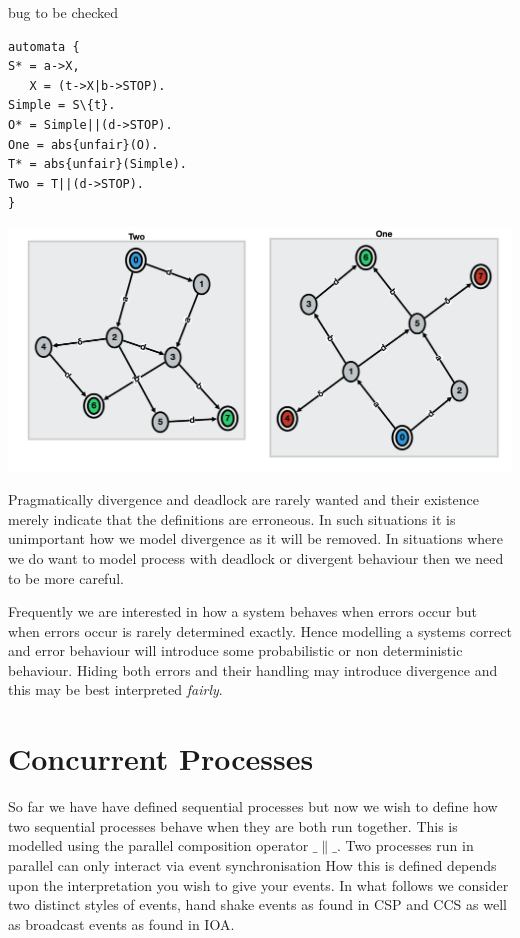 \documentclass[]{article}
\newcounter{dead1}
\newcounter{dead2}
\begin{document}
{\color{red} bug to be checked}
\noindent\begin{center}
\begin{minipage}{0.3\textwidth}
\begin{verbatim}
automata {
S* = a->X,
   X = (t->X|b->STOP).
Simple = S\{t}.
O* = Simple||(d->STOP).
One = abs{unfair}(O).
T* = abs{unfair}(Simple).
Two = T||(d->STOP).
}
\end{verbatim}\end{minipage}
\begin{minipage}{0.5\textwidth}
\includegraphics[scale=0.3]{OneTwo.png} 
\end{minipage}\end{center}
Pragmatically divergence and deadlock are rarely wanted and their existence merely indicate that the definitions are erroneous. In such situations it is unimportant how we model divergence as it will be removed. In situations where we do want to model process with deadlock  or divergent behaviour then we need to be more careful.


Frequently we are interested in how a system behaves when errors occur but when errors occur is rarely determined exactly. Hence modelling a systems correct and error behaviour will introduce some probabilistic or non deterministic behaviour. Hiding both errors and their handling may introduce divergence and this may be best interpreted \emph{fairly}.

 
\section{Concurrent Processes }
So far we have have defined sequential processes but now we wish to define how two sequential processes behave when they are both run together. This is modelled using the parallel composition operator $\_\parallel\_$.
Two processes run in parallel can only interact via event synchronisation How this is defined depends upon the interpretation you wish to give your events. In what follows we consider two distinct styles of events, hand shake events as found in CSP and CCS as well as broadcast events as found in IOA.
\end{document}
